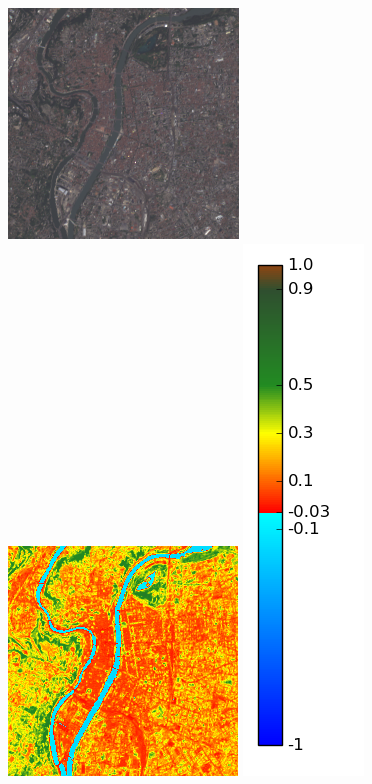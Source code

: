 \documentclass{book}
\begin{document}
\begin{figure}[H]
\centerline{
\includegraphics[scale=0.6]{../3_ndvi/images/Lyon/07_rgb.png}
\includegraphics[scale=0.6]{../3_ndvi/images/Lyon/07_ndvi.png}
\includegraphics[scale=0.3]{../3_ndvi/images/colormap.png}
}
\end{figure}
\end{document}
